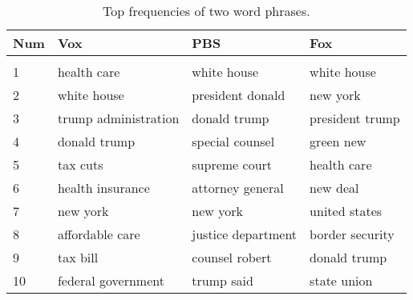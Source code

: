 \begin{table}[H]
    \centering
    \caption{Top frequencies of two word phrases.}
    \label{tab:2gram}
    \begin{tabular}{l|l|l|l} \hline
    \textbf{Num} & \textbf{Vox} & \textbf{PBS} & \textbf{Fox} \\ \hline \hline
    &&&  \\
    1   & health care          & white house        & white house    \\
    2   & white house          & president donald   & new york       \\
    3   & trump administration & donald trump       & president trump\\
    4   & donald trump         & special counsel    & green new      \\
    5   & tax cuts             & supreme court      & health care    \\
    6   & health insurance     & attorney general   & new deal       \\
    7   & new york             & new york           & united states  \\
    8   & affordable care      & justice department & border security\\
    9   & tax bill             & counsel robert     & donald trump   \\
    10  & federal government   & trump said         & state union    \\ \hline
    \end{tabular}
\end{table}